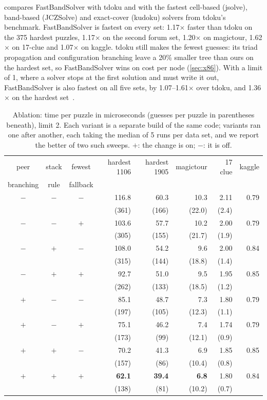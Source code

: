 \documentclass[a4paper,USenglish,cleveref,anonymous]{lipics-v2021}
\newif\ifanon
\newcommand{\selfcite}[1]{\ifanon[anonymized]\else\cite{#1}\fi}
\begin{document}
 compares FastBandSolver with tdoku and with the fastest cell-based (jsolve), band-based (JCZSolve) and
exact-cover (kudoku) solvers from tdoku's benchmark. FastBandSolver is fastest on every set: 1.17$\times$ faster than
tdoku on the 375 hardest puzzles, 1.17$\times$ on the second forum set, 1.20$\times$ on magictour, 1.62$\times$ on
17-clue and 1.07$\times$ on kaggle. tdoku still makes the fewest guesses: its triad propagation and configuration
branching leave a 20\% smaller tree than ours on the hardest set, so FastBandSolver wins on cost per node
(\cref{sec:x86}). With a limit of 1, where a solver stops at the first solution and must write it out,
FastBandSolver is also fastest on all five sets, by 1.07--1.61$\times$ over tdoku, and 1.36$\times$ on the hardest
set~\selfcite{kelly2026full}.

\begin{table}[t]
\centering
\caption{Ablation: time per puzzle in microseconds (guesses per puzzle in parentheses beneath), limit 2. Each variant is a separate
build of the same code; variants ran one after another, each taking the median of 5 runs per data set, and we report
the better of two such sweeps. $+$: the change is on; $-$: it is off.}
\label{tab:ablation}
\small
\begin{tabular}{cccrrrrr}
\toprule
peer & stack & fewest & hardest 1106 & hardest 1905 & magictour & 17 clue & kaggle \\
branching & rule & fallback & & & & & \\
\midrule
$-$ & $-$ & $-$ & 116.8 & 60.3 & 10.3 & 2.11 & 0.79 \\
&&& (361) & (166) & (22.0) & (2.4) & \\[2pt]
$-$ & $-$ & $+$ & 103.6 & 57.7 & 10.2 & 2.00 & 0.79 \\
&&& (305) & (155) & (21.7) & (1.9) & \\[2pt]
$-$ & $+$ & $-$ & 108.0 & 54.2 & 9.6 & 2.00 & 0.84 \\
&&& (315) & (144) & (18.8) & (1.4) & \\[2pt]
$-$ & $+$ & $+$ & 92.7 & 51.0 & 9.5 & 1.95 & 0.85 \\
&&& (262) & (133) & (18.5) & (1.2) & \\[2pt]
$+$ & $-$ & $-$ & 85.1 & 48.7 & 7.3 & 1.80 & 0.79 \\
&&& (197) & (105) & (12.3) & (1.1) & \\[2pt]
$+$ & $-$ & $+$ & 75.1 & 46.2 & 7.4 & 1.74 & 0.79 \\
&&& (173) & (99) & (12.1) & (0.9) & \\[2pt]
$+$ & $+$ & $-$ & 70.2 & 41.3 & 6.9 & 1.85 & 0.85 \\
&&& (157) & (86) & (10.4) & (0.8) & \\[2pt]
$+$ & $+$ & $+$ & \textbf{62.1} & \textbf{39.4} & \textbf{6.8} & 1.80 & 0.84 \\
&&& (138) & (81) & (10.2) & (0.7) & \\[2pt]
\bottomrule
\end{tabular}
\end{table}
\end{document}
